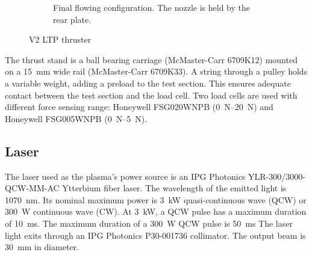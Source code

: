\begin{figure}[!ht]
\begin{subfigure}[t]{0.45\textwidth}
                    \caption{Final flowing configuration. The nozzle is held by the rear plate.}
                \end{subfigure}
                \caption{V2 LTP thruster}
                \label{fig:V2 setup}
            \end{figure}

            The thrust stand is a ball bearing carriage (McMaster-Carr 6709K12) mounted on a \qty{15}{mm} wide rail (McMaster-Carr 6709K33). A string through a pulley holds a variable weight, adding a preload to the test section. This ensures adequate contact between the test section and the load cell. Two load cells are used with different force sensing range: Honeywell FSG020WNPB (\qtyrange{0}{20}{N}) and Honeywell FSG005WNPB (\qtyrange{0}{5}{N}).

        \subsection{Laser}

            The laser used as the plasma's power source is an IPG Photonics YLR-300/3000-QCW-MM-AC Ytterbium fiber laser. The wavelength of the emitted light is \qty{1070}{nm}. Its nominal maximum power is \qty{3}{kW} quasi-continuous wave (QCW) or \qty{300}{W} continuous wave (CW). At \qty{3}{kW}, a QCW pulse has a maximum duration of \qty{10}{ms}. The maximum duration of a \qty{300}{W} QCW pulse is \qty{50}{ms} The laser light exits through an IPG Photonics P30-001736 collimator. The output beam is \qty{30}{mm} in diameter.

